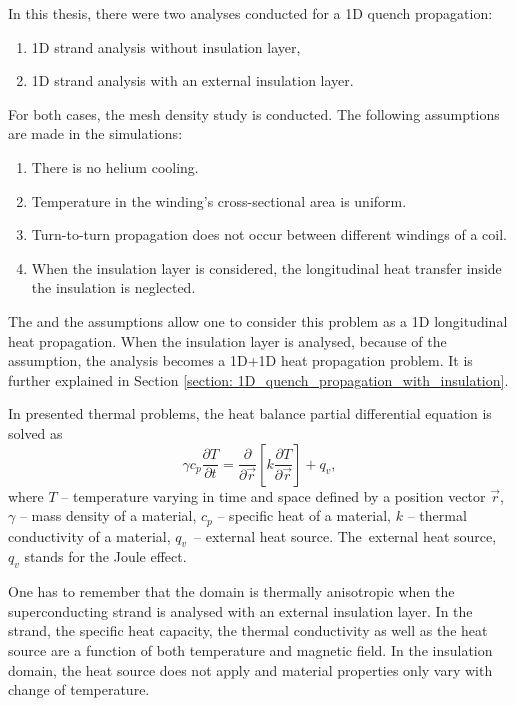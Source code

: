
In this thesis, there were two analyses conducted for a 1D quench propagation: 

\begin{enumerate}
    \item 1D strand analysis without insulation layer,
    \item 1D strand analysis with an external insulation layer.
\end{enumerate}

For both cases, the mesh density study is conducted. The following assumptions are made in the simulations: 

\begin{enumerate}
    \item There is no helium cooling.
    \item Temperature in the winding's cross-sectional area is uniform.
    \item Turn-to-turn propagation does not occur between different windings of a coil.
    \item When the insulation layer is considered, the longitudinal heat transfer inside the insulation is neglected.
\end{enumerate}

The  and the  assumptions allow one to consider this problem as a 1D longitudinal heat propagation. When the insulation layer is analysed, because of the  assumption, the analysis becomes a 1D+1D heat propagation problem. It is further explained in Section \ref{section: 1D_quench_propagation_with_insulation}.

In presented thermal problems, the heat balance partial differential equation is solved as
\begin{equation}
    \gamma c_p \frac{\partial T}{\partial t} = \frac{\partial}{\partial \vec{r}}[k \frac{\partial T}{\partial \vec{r}}] + q_v,
\end{equation}
where $T$ -- temperature varying in time and space defined by a position vector $\vec{r}$, $\gamma$ -- mass density of a material, $c_p$ -- specific heat of a material, $k$ -- thermal conductivity of a material, $q_v$~-- external heat source. The~external heat source, $q_v$ stands for the Joule effect.

One has to remember that the domain is thermally anisotropic when the superconducting strand is analysed with an external insulation layer. In the strand, the specific heat capacity, the thermal conductivity as well as the heat source are a function of both temperature and magnetic field. In the insulation domain, the heat source does not apply and material properties only vary with change of temperature.
